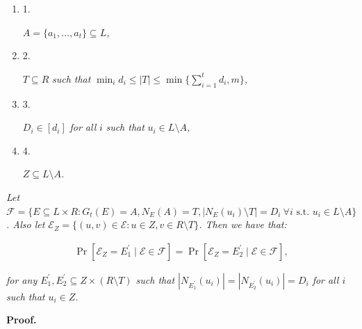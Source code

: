 \begin{enumerate}


\item[] 1. 


$A=\{a_{1},\dots,a_{t}\}\subseteq L$\emph{,}\par




\item[] 2. 


$T\subseteq R$\emph{ such that }$\min_{i}{d_{i}}\leq|T|\leq\min\{\sum_{i=1}^{t}d_{i},m\}$\emph{,}\par




\item[] 3. 


$D_{i}\in[d_{i}]$\emph{ for all }$i$\emph{ such that }$u_{i}\in L\setminus A$\emph{,}\par




\item[] 4. 


$Z\subseteq L\setminus A$\emph{.}\par




\end{enumerate}


\emph{Let $\mathscr{F}=\{E\subseteq L\times R:G_{t}(E)=A,N_{E}(A)=T,|N_{E}(u_{i})\setminus T|=D_{i}\ \forall i\text{ s.t. }u_{i}\in L\setminus A\}$.
Also let $\mathcal{E}_{Z}=\{(u,v)\in\mathcal{E}:u\in Z,v\in R\setminus T\}$.
Then we have that:}\par


\[\begin{gathered}
\displaystyle\Pr\left[\mathcal{E}_{Z}=E^{\prime}_{1}\mid\mathcal{E}\in\mathscr{F}\right]=\Pr\left[\mathcal{E}_{Z}=E^{\prime}_{2}\mid\mathcal{E}\in\mathscr{F}\right],
\end{gathered}\]


\emph{for any $E^{\prime}_{1},E^{\prime}_{2}\subseteq Z\times(R\setminus T)$ such that $|N_{E^{\prime}_{1}}(u_{i})|=|N_{E^{\prime}_{2}}(u_{i})|=D_{i}$ for all $i$ such that $u_{i}\in Z$.}\par






\par\medskip\noindent\textbf{Proof.}\par



